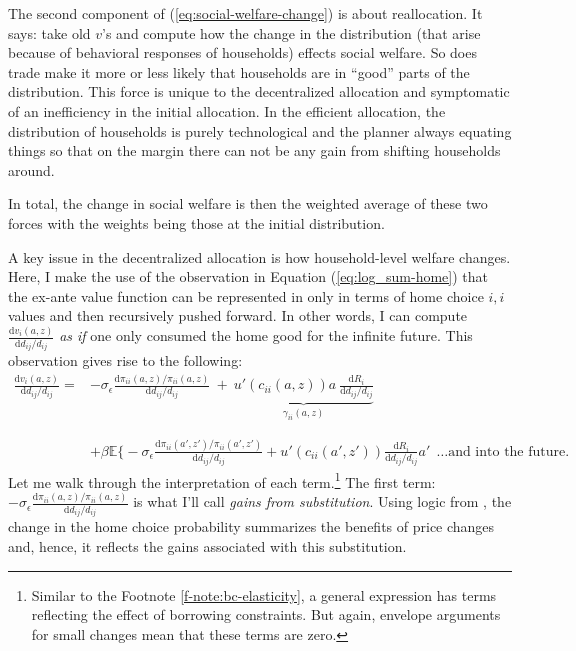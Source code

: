\documentclass[12pt,pdftex]{article}
\begin{document}
\begin{onehalfspacing}
The second component of (\ref{eq:social-welfare-change}) is about reallocation. It says: take old $v$'s and compute how the change in the distribution (that arise because of behavioral responses of households) effects social welfare. So does trade make it more or less likely that households are in ``good'' parts of the distribution. This force is unique to the decentralized allocation and symptomatic of an inefficiency in the initial allocation. In the efficient allocation, the distribution of households is purely technological and the planner always equating things so that on the margin there can not be any gain from shifting households around.

In total, the change in social welfare is then the weighted average of these two forces with the weights being those at the initial distribution.

A key issue in the decentralized allocation is how household-level welfare changes. Here, I make the use of the observation in Equation (\ref{eq:log_sum-home}) that the ex-ante value function can be represented in only in terms of home choice $i,i$ values and then recursively pushed forward. In other words, I can compute $\frac{\mathrm{d} v_i(a, z)}{\mathrm{d} d_{ij} / d_{ij}}$ \emph{as if} one only consumed the home good for the infinite future. This observation gives rise to the following:
\begin{align}
\frac{\mathrm{d} v_i(a, z)}{\mathrm{d} d_{ij} / d_{ij}} =& -\sigma_{\epsilon} \frac{\mathrm{d} \pi_{ii}(a,z) / \pi_{ii}(a,z)}{\mathrm{d}d_{ij} / d_{ij}} \ + \ \underbrace{u'(c_{ii}(a,z))a \ \frac{\mathrm{d} R_{i}}{\mathrm{d} d_{ij} / d_{ij}}}_{\gamma_{ii}(a,z)} \\
\nonumber \\
\nonumber \\
& + \beta \mathbb{E} \bigg \{ -\sigma_{\epsilon} \frac{\mathrm{d} \pi_{ii}(a',z') / \pi_{ii}(a',z')}{\mathrm{d}d_{ij} / d_{ij}} +  u'(c_{ii}(a',z'))\frac{\mathrm{d} R_{i}}{\mathrm{d} d_{ij} / d_{ij}}a' \ \  \ldots \mbox{and into the future.} \nonumber
\end{align}
Let me walk through the interpretation of each term.\footnote{Similar to the Footnote \ref{f-note:bc-elasticity}, a general expression has terms reflecting the effect of borrowing constraints. But again, envelope arguments for small changes mean that these terms are zero.} The first term: $-\sigma_{\epsilon} \frac{\mathrm{d} \pi_{ii}(a,z) / \pi_{ii}(a,z)}{\mathrm{d}d_{ij} / d_{ij}}$ is what I'll call \emph{gains from substitution}. Using logic from \citet{arkolakis2012new}, the change in the home choice probability summarizes the benefits of price changes and, hence, it reflects the gains associated with this substitution.


\end{onehalfspacing}
\end{document}
